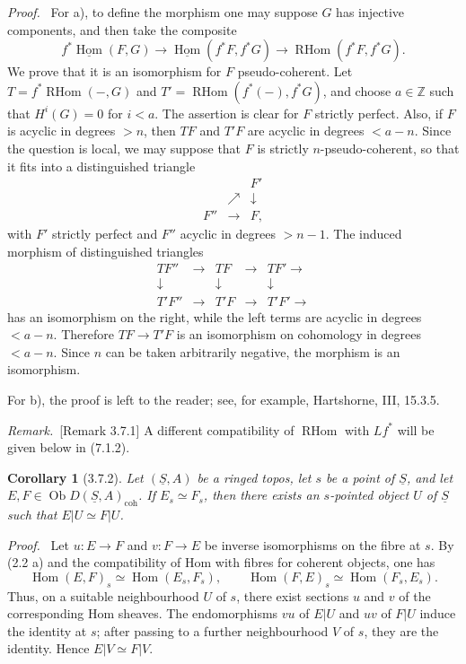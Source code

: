 \documentclass[11pt]{article}
\theoremstyle{plain}
\newtheorem*{corollary*}{Corollary}
\theoremstyle{definition}
\theoremstyle{remark}
\newenvironment{prooftext}{\par\noindent\textit{Proof.}\ }{\par\medskip}
\newenvironment{remarktext}{\par\medskip\noindent\textit{Remark.}\ }{\par\medskip}
\newcommand{\ZZ}{\mathbb Z}
\DeclareMathOperator{\Hom}{Hom}
\DeclareMathOperator{\ob}{Ob}
\DeclareMathOperator{\RHom}{RHom}
\providecommand{\uS}{\underline{S}}
\begin{document}
\begin{prooftext}
For a), to define the morphism one may suppose $G$ has injective components, and then take the composite
\[
f^*\underline{\Hom}(F,G)\longrightarrow
\underline{\Hom}(f^*F,f^*G)\longrightarrow
\RHom(f^*F,f^*G).
\]
We prove that it is an isomorphism for $F$ pseudo-coherent. Let $T=f^*\RHom(-,G)$ and $T'=\RHom(f^*(-),f^*G)$, and choose $a\in\ZZ$ such that $H^i(G)=0$ for $i<a$. The assertion is clear for $F$ strictly perfect. Also, if $F$ is acyclic in degrees $>n$, then $TF$ and $T'F$ are acyclic in degrees $<a-n$. Since the question is local, we may suppose that $F$ is strictly $n$-pseudo-coherent, so that it fits into a distinguished triangle
\[
\begin{array}{ccc}
&&F'\\
&\nearrow&\downarrow\\
F''&\longrightarrow&F,
\end{array}
\]
with $F'$ strictly perfect and $F''$ acyclic in degrees $>n-1$. The induced morphism of distinguished triangles
\[
\begin{array}{ccccc}
TF''&\longrightarrow&TF&\longrightarrow&TF'\longrightarrow\\
\downarrow&&\downarrow&&\downarrow\\
T'F''&\longrightarrow&T'F&\longrightarrow&T'F'\longrightarrow
\end{array}
\]
has an isomorphism on the right, while the left terms are acyclic in degrees $<a-n$. Therefore $TF\to T'F$ is an isomorphism on cohomology in degrees $<a-n$. Since $n$ can be taken arbitrarily negative, the morphism is an isomorphism.

For b), the proof is left to the reader; see, for example, Hartshorne, III, 15.3.5.
\end{prooftext}

\begin{remarktext}[Remark 3.7.1]
A different compatibility of $\RHom$ with $Lf^*$ will be given below in (7.1.2).
\end{remarktext}

\begin{corollary*}[3.7.2]
Let $(\uS,A)$ be a ringed topos, let $s$ be a point of $\uS$, and let $E,F\in\ob D(\uS,A)_{\mathrm{coh}}$. If $E_s\simeq F_s$, then there exists an $s$-pointed object $U$ of $\uS$ such that $E|U\simeq F|U$.
\end{corollary*}

\begin{prooftext}
Let $u:E\to F$ and $v:F\to E$ be inverse isomorphisms on the fibre at $s$. By (2.2 a) and the compatibility of Hom with fibres for coherent objects, one has
\[
\Hom(E,F)_s\simeq\Hom(E_s,F_s),\qquad
\Hom(F,E)_s\simeq\Hom(F_s,E_s).
\]
Thus, on a suitable neighbourhood $U$ of $s$, there exist sections $u$ and $v$ of the corresponding Hom sheaves. The endomorphisms $vu$ of $E|U$ and $uv$ of $F|U$ induce the identity at $s$; after passing to a further neighbourhood $V$ of $s$, they are the identity. Hence $E|V\simeq F|V$.
\end{prooftext}
\end{document}
